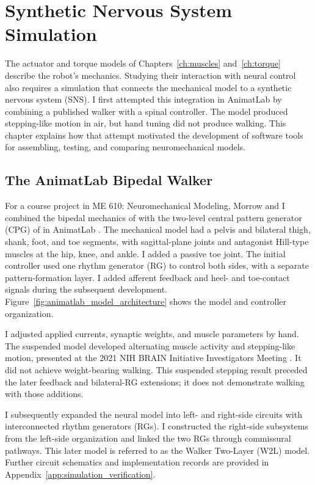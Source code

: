 \chapter{Synthetic Nervous System Simulation}\label{ch:sns}
\graphicspath{{figs/60-sns/}{figs/60-sns/AnimatLab_reference/}}

The actuator and torque models of Chapters~\ref{ch:muscles} and~\ref{ch:torque} describe the robot's mechanics. Studying their interaction with neural control also requires a simulation that connects the mechanical model to a synthetic nervous system (SNS). I first attempted this integration in AnimatLab by combining a published walker with a spinal controller. The model produced stepping-like motion in air, but hand tuning did not produce walking. This chapter explains how that attempt motivated the development of software tools for assembling, testing, and comparing neuromechanical models.

\section{The AnimatLab Bipedal Walker}\label{sec:prior_walker}

For a course project in ME 610: Neuromechanical Modeling, Morrow and I combined the bipedal mechanics of \citet{li_bipedal_2017} with the two-level central pattern generator (CPG) of \citet{deng_neuromechanical_2019} in AnimatLab \citep{cofer_animatlab_2010}. The mechanical model had a pelvis and bilateral thigh, shank, foot, and toe segments, with sagittal-plane joints and antagonist Hill-type muscles at the hip, knee, and ankle. I added a passive toe joint. The initial controller used one rhythm generator (RG) to control both sides, with a separate pattern-formation layer. I added afferent feedback and heel- and toe-contact signals during the subsequent development. Figure~\ref{fig:animatlab_model_architecture} shows the model and controller organization.

I adjusted applied currents, synaptic weights, and muscle parameters by hand. The suspended model developed alternating muscle activity and stepping-like motion, presented at the 2021 NIH BRAIN Initiative Investigators Meeting \citep{bolenTorqueValuesArtificialKnee2021June15-17}. It did not achieve weight-bearing walking. This suspended stepping result preceded the later feedback and bilateral-RG extensions; it does not demonstrate walking with those additions.

I subsequently expanded the neural model into left- and right-side circuits with interconnected rhythm generators (RGs). I constructed the right-side subsystems from the left-side organization and linked the two RGs through commissural pathways. This later model is referred to as the Walker Two-Layer (W2L) model. Further circuit schematics and implementation records are provided in Appendix~\ref{app:simulation_verification}.

